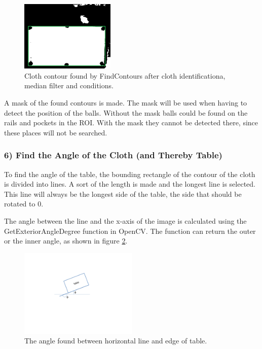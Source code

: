 \begin{figure}[H]
\begin{center}
\leavevmode
\includegraphics[width=0.4\textwidth]{images/clothcontour}
\end{center}
\caption{Cloth contour found by FindContours after cloth identificationa, median filter and conditions.}
\label{fig:clothcontour}
\end{figure}

A mask of the found contours is made. The mask will be used when having to detect the position of the balls. Without the mask balls could be found on the rails and pockets in the ROI. With the mask they cannot be detected there, since these places will not be searched.


\subsubsection{6) Find the Angle of the Cloth (and Thereby Table)}
To find the angle of the table, the bounding rectangle of the contour of the cloth is divided into lines. A sort of the length is made and the longest line is selected. This line will always be the longest side of the table, the side that should be rotated to 0\degree.

The angle between the line and the x-axis of the image is calculated using the GetExteriorAngleDegree function in OpenCV. The function can return the outer or the inner angle, as shown in figure \ref{fig:table_angle}.
\begin{figure}[htpb]
\begin{center}
\leavevmode
\includegraphics[width=0.5\textwidth]{images/table_angle}
\end{center}
\caption{The angle found between horizontal line and edge of table.}
\label{fig:table_angle}
\end{figure}


